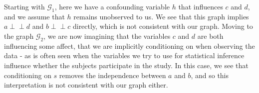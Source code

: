 \documentclass[11pt, a4paper]{memoir}
\theoremstyle{break}
\theoremstyle{break}
\theoremstyle{nonumberplain}
\newcommand{\indep}{\perp \!\!\! \perp}
\begin{document}
\begin{center}
\end{center}
Starting with $\mathcal{G}_1$, here we have a confounding variable $h$ that influences $c$ and $d$, and we assume that $h$ remains unobserved to us. We see that this graph implies $a\indep d$ and $b\indep c$ directly, which is not consistent with our graph. Moving to the graph $\mathcal{G}_2$, we are now imagining that the variables $c$ and $d$ are both influencing some affect, that we are implicitly conditioning on when observing the data - as is often seen when the variables we try to use for statistical inference influence whether the subjects participate in the study. In this case, we see that conditioning on $s$ removes the independence between $a$ and $b$, and so this interpretation is not consistent with our graph either.\\\\
\end{document}
